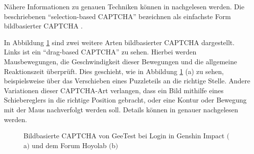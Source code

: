 Nähere Informationen zu genauen Techniken können in \cite[p.77ff]{surveyofresearch} nachgelesen werden.
Die beschriebenen ``selection-based CAPTCHA'' bezeichnen \citeauthor{surveyofresearch} als einfachste Form bildbasierter CAPTCHA \cite[p.77]{surveyofresearch}. 

In Abbildung \ref{fig:genshin} sind zwei weitere Arten bildbasierter CAPTCHA dargestellt.
Links ist ein ``drag-based CAPTCHA'' zu sehen.
Hierbei werden Mausbewegungen, die Geschwindigkeit dieser Bewegungen
und die allgemeine Reaktionszeit überprüft.
Dies geschieht, wie in Abbildung \ref{fig:genshin} (a) zu sehen,
beispielsweise über das Verschieben eines Puzzleteils an die richtige Stelle.
Andere Variationen dieser CAPTCHA-Art verlangen, dass ein Bild mithilfe eines Schiebereglers in die richtige Position gebracht,
oder eine Kontur oder Bewegung mit der Maus nachverfolgt werden soll.
Details können in \cite[p.77]{surveyofresearch} genauer nachgelesen werden.

\begin{figure}[h!]
    \centering
    \qquad
    \caption{Bildbasierte CAPTCHA von GeeTest bei Login in Genshin Impact $($a$)$ und dem Forum Hoyolab $($b$)$}   
    \label{fig:genshin}
\end{figure}

